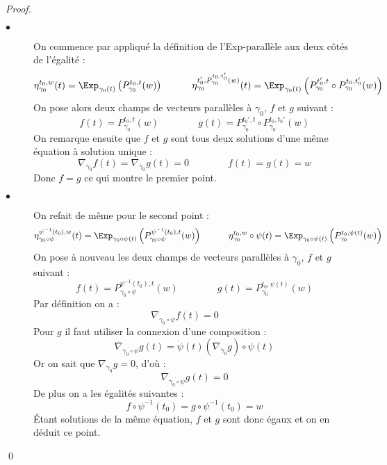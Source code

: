 \begin{proof}
	\begin{description}
		\item[$\bullet$] On commence par appliqué la définition de l'Exp-parallèle aux deux côtés de l'égalité :
		\begin{equation}
			\eta_{\gamma_0}^{t_0, w}(t) = \Exp_{\gamma_0(t)} \left( P_{\gamma_0}^{t_0, t}(w) \right) \qquad \quad \eta_{\gamma_0}^{t_0', P_{\gamma_0}^{t_0, t_0'}(w)}(t) = \Exp_{\gamma_0(t)} \left( P_{\gamma_0}^{t_0', t} \circ P_{\gamma_0}^{t_0, t_0'}(w) \right)
		\end{equation}
		On pose alors deux champs de vecteurs parallèles à $\gamma_0$, $f$ et $g$ suivant :
		\begin{equation}
			f(t) = P_{\gamma_0}^{t_0, t}(w) \qquad \qquad g(t) = P_{\gamma_0}^{t_0', t} \circ P_{\gamma_0}^{t_0, t_0'}(w)
		\end{equation}
		On remarque ensuite que $f$ et $g$ sont tous deux solutions d'une même équation à solution unique :
		\begin{equation}
			\nabla_{\dot{\gamma_0}} f(t) = \nabla_{\dot{\gamma_0}} g(t) = 0 \qquad \qquad f(t) = g(t) = w
		\end{equation}
		Donc $f = g$ ce qui montre le premier point.
		
		\item[$\bullet$] On refait de même pour le second point :
		\begin{equation}
			\eta_{\gamma_0 \circ \psi}^{\psi^{-1}(t_0), w}(t) = \Exp_{\gamma_0 \circ \psi(t)} \left( P_{\gamma_0 \circ \psi}^{\psi^{-1}(t_0), t}(w) \right) \qquad \quad \eta_{\gamma_0}^{t_0, w} \circ \psi(t) = \Exp_{\gamma_0 \circ \psi(t)} \left( P_{\gamma_0}^{t_0, \psi(t)}(w) \right)
		\end{equation}
		On pose à nouveau les deux champs de vecteurs parallèles à $\gamma_0$, $f$ et $g$ suivant :
		\begin{equation}
			f(t) = P_{\gamma_0 \circ \psi}^{\psi^{-1}(t_0), t}(w) \qquad \qquad g(t) = P_{\gamma_0}^{t_0, \psi(t)}(w)
		\end{equation}
		Par définition on a :
		\begin{equation}
			\nabla_{\dot{\gamma_0 \circ \psi}} f(t) = 0 \qquad
		\end{equation}
		Pour $g$ il faut utiliser la connexion d'une composition :
		\begin{equation}
			\nabla_{\dot{\gamma_0 \circ \psi}} g(t) = \dot{\psi}(t) \left( \nabla_{\dot{\gamma}_0} g \right) \circ \psi(t)
		\end{equation}
		Or on sait que $\nabla_{\dot{\gamma}_0} g = 0$, d'où :
		\begin{equation}
			\nabla_{\dot{\gamma_0 \circ \psi}} g(t) = 0
		\end{equation}
		De plus on a les égalités suivantes :
		\begin{equation}
			f \circ \psi^{-1}(t_0) = g \circ \psi^{-1}(t_0) = w
		\end{equation}
		Étant solutions de la même équation, $f$ et $g$ sont donc égaux et on en déduit ce point.
	\end{description}
	\qed
\end{proof}

